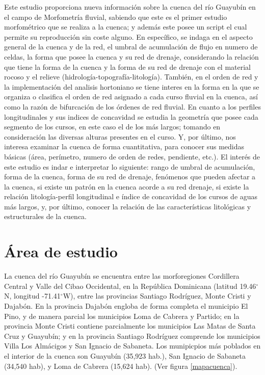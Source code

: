 \documentclass[11pt,]{article}
\begin{document}
Este estudio proporciona nueva información sobre la cuenca del río
Guayubín en el campo de Morfometría fluvial, sabiendo que este es el
primer estudio morfométrico que se realiza a la cuenca; y además este
posee un script el cual permite su reproducción sin coste alguno. En
específico, se indaga en el aspecto general de la cuenca y de la red, el
umbral de acumulación de flujo en numero de celdas, la forma que posee
la cuenca y su red de drenaje, considerando la relación que tiene la
forma de la cuenca y la forma de su red de drenaje con el material
rocoso y el relieve (hidrología-topografía-litología). También, en el
orden de red y la implementación del analisis hortoniano se tiene
interes en la forma en la que se organiza o clasifica el orden de red
asignado a cada curso fluvial en la cuenca, así como la razón de
bifurcación de los órdenes de red fluvial. En cuanto a los perfiles
longitudinales y sus indices de concavidad se estudia la geometría que
posee cada segmento de los cursos, en este caso el de los más largos;
tomando en consideración las diversas alturas presentes en el curso. Y,
por último, nos interesa examinar la cuenca de forma cuantitativa, para
conocer sus medidas básicas (área, perímetro, numero de orden de redes,
pendiente, etc.). El interés de este estudio es indar e interpretar lo
siguiente: rango de umbral de acumulación, forma de la cuenca, forma de
su red de drenaje, fenómenos que pueden afectar a la cuenca, si existe
un patrón en la cuenca acorde a su red drenaje, si existe la relación
litología-perfil longitudinal e índice de concavidad de los cursos de
aguas más largos, y, por último, conocer la relación de las
características litológicas y estructurales de la cuenca.

\section{Área de estudio}\label{uxe1rea-de-estudio}

La cuenca del río Guayubín se encuentra entre las morforegiones
Cordillera Central y Valle del Cibao Occidental, en la República
Dominicana (latitud 19.46\(^\circ\)N, longitud -71.41\(^\circ\)W), entre
las provincias Santiago Rodríguez, Monte Cristi y Dajabón. En la
provincia Dajabón engloba de forma completa el municipio El Pino, y de
manera parcial los municipios Loma de Cabrera y Partido; en la provincia
Monte Cristi contiene parcialmente los municipios Las Matas de Santa
Cruz y Guayubín; y en la provincia Santiago Rodríguez comprende los
municipios Villa Los Almácigos y San Ignacio de Sabaneta. Los
munipicpios más poblados en el interior de la cuenca son Guayubín
(35,923 hab.), San Ignacio de Sabaneta (34,540 hab), y Loma de Cabrera
(15,624 hab). (Ver figura \ref {mapacuenca}).
\end{document}

